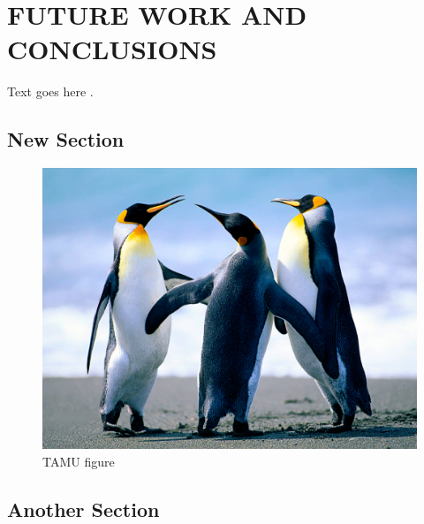 %
%
%



\chapter{\uppercase{Future Work and Conclusions}}

Text goes here \cite{ApacheHadoop}.

\section{New Section}

\begin{figure}[H]
\centering
\includegraphics[scale=.50]{figures/Penguins.jpg}
\caption{TAMU figure}
\label{fig:tamu-fig3}
\end{figure}
\section{Another Section}

